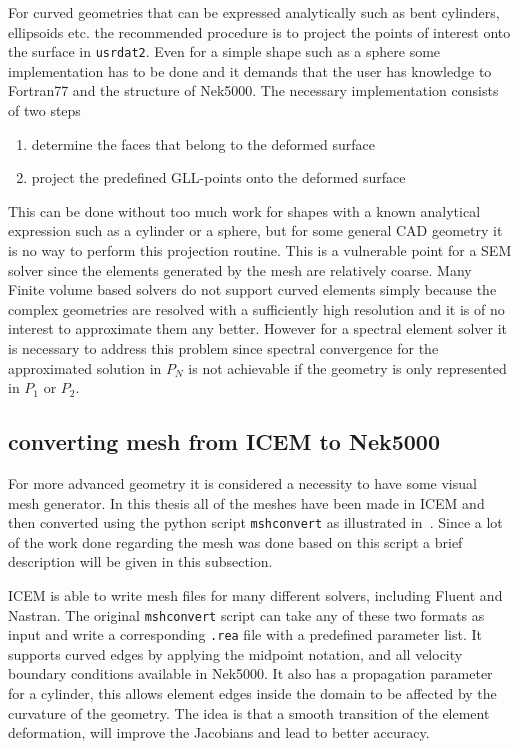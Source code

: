 For curved geometries that can be expressed analytically such as bent cylinders, ellipsoids etc. 
the recommended procedure is to project the points of interest onto the surface
in \verb|usrdat2|. Even for a simple shape such as a sphere some implementation
has to be done and it demands that the user has knowledge to Fortran77 and the structure of Nek5000.
The necessary implementation consists of two steps 
%
\begin{enumerate}
    \item determine the faces that belong to the deformed surface
    \item project the predefined GLL-points onto the deformed surface
\end{enumerate}
%
This can be done without too much work for shapes with a known analytical 
expression such as a cylinder or a sphere, but for some general CAD geometry 
it is no way to perform this projection routine. This is a vulnerable point 
for a SEM solver since the elements generated by the mesh are relatively coarse.
Many Finite volume based solvers do not support curved elements simply because the 
complex geometries are resolved with a sufficiently high resolution and it 
is of no interest to approximate them any better. However for a spectral element
solver it is necessary to address this problem since spectral convergence 
for the approximated solution in $P_N$ is not achievable 
if the geometry is only represented in $P_{1}$ or $P_{2}$.

\subsection{converting mesh from ICEM to Nek5000}

For more advanced geometry it is considered a necessity to have some visual mesh generator.
In this thesis all of the meshes have been made in ICEM and then converted using the python 
script \verb|mshconvert| as illustrated in~. Since a lot 
of the work done regarding the mesh was done based on this script a brief description will be 
given in this subsection.

ICEM is able to write mesh files for many different solvers, including Fluent and Nastran. 
The original \verb|mshconvert| script can take any of these two formats as input and write a 
corresponding \verb|.rea| file with a predefined parameter list. It supports curved 
edges by applying the midpoint notation, and all velocity boundary conditions available in Nek5000.
It also has a propagation parameter for a cylinder, this allows element edges inside
the domain to be affected by the curvature of the geometry. The idea is that a smooth 
transition of the element deformation, will improve the Jacobians and lead to better accuracy.  

